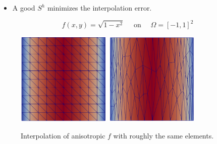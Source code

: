 \documentclass{beamer}
\begin{document}
  \begin{frame}
	\begin{itemize}
		\item A good $S^h$ minimizes the interpolation error. 
	\end{itemize}

		\begin{equation*}
			f(x, y) = \sqrt{1 - x^2} \quad \text{ on } \quad \Omega =  [-1, 1]^2
		\end{equation*}
		\begin{figure}
			\includegraphics[width=0.40\textwidth]{Figures/original.png}
			\includegraphics[width=0.40\textwidth]{Figures/adapted.png}
			\caption{Interpolation of anisotropic $f$ with roughly the same elements.}
		\end{figure}
  \end{frame}
\end{document}
